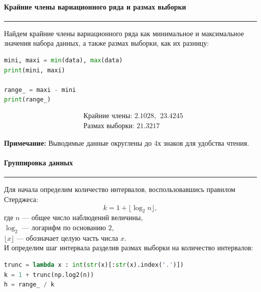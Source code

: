 \documentclass[a4paper, 14pt]{extarticle}
\begin{document}
\paragraph{Крайние члены вариационного ряда и размах выборки}\vspace{-20pt}\rule{\linewidth}{0.1mm}

Найдем крайние члены вариационного ряда как минимальное и максимальное значения 
набора данных, а также размах выборки, как их разницу:

\vspace{10pt}

\begin{lstlisting}[language=Python]
mini, maxi = min(data), max(data)
print(mini, maxi)

range_ = maxi - mini
print(range_)
\end{lstlisting}

\vspace{-5pt}

\begin{align*}
  & \text{Крайние члены: }  2.1028, \hspace{5pt} 23.4245 \\
  & \text{Размах выборки: }  21.3217
\end{align*}

{\footnotesize \textbf{Примечание:} Выводимые данные округлены до 4х знаков для удобства чтения.}

\newpage

\paragraph{Группировка данных}\vspace{-20pt}\rule{\linewidth}{0.1mm}

Для начала определим количество интервалов, воспользовавшись правилом
Стерджеса:
\begin{equation*}
    k = 1 + \lfloor \log_2 n \rfloor,
\end{equation*}
где $n$ — общее число наблюдений величины, \\ 
$\log_2$ — логарифм по основанию 2, \\
$\lfloor x \rfloor$ — обозначает целую часть числа $x$. \\

И определим шаг интервала разделив размах выборки на количество интервалов:

\vspace{10pt}

\begin{lstlisting}[language=Python]
trunc = lambda x : int(str(x)[:str(x).index('.')])
k = 1 + trunc(np.log2(n))
h = range_ / k
\end{lstlisting}
\end{document}
